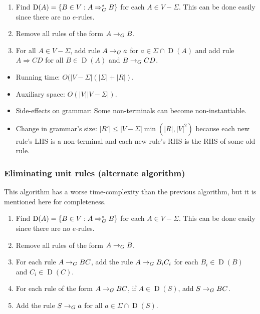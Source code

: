 \begin{enumerate}
\item Find $\operatorname{D}(A) = \{B \in V: A \Rightarrow_{G}^* B\}$ for each $A \in V-\Sigma$.
    This can be done easily since there are no $e$-rules.
\item Remove all rules of the form $A \rightarrow_{G} B$.
\item For all $A \in V - \Sigma$, add rule $A \rightarrow_{G} a$ for $a \in \Sigma \cap \operatorname{D}(A)$
    and add rule $A \Rightarrow CD$ for all $B \in \operatorname{D}(A)$ and $B \rightarrow_{G} CD$.
\end{enumerate}

\begin{itemize}
\item Running time: $O(|V-\Sigma|(|\Sigma| + |R|)$.
\item Auxiliary space: $O(|V||V-\Sigma|)$.
\item Side-effects on grammar: Some non-terminals can become non-instantiable.
\item Change in grammar's size: $|R'| \le |V-\Sigma|\min(|R|, |V|^2)$
    because each new rule's LHS is a non-terminal and each new rule's RHS is the RHS of some old rule.
\end{itemize}

\subsubsection{Eliminating unit rules (alternate algorithm)}

This algorithm has a worse time-complexity than the previous algorithm,
but it is mentioned here for completeness.

\begin{enumerate}
\item Find $\operatorname{D}(A) = \{B \in V: A \Rightarrow_{G}^* B\}$ for each $A \in V-\Sigma$.
    This can be done easily since there are no $e$-rules.
\item Remove all rules of the form $A \rightarrow_{G} B$.
\item For each rule $A \rightarrow_{G} BC$, add the rule
    $A \rightarrow_{G} B_iC_i$ for each $B_i \in \operatorname{D}(B)$ and $C_i \in \operatorname{D}(C)$.
\item For each rule of the form $A \rightarrow_{G} BC$, if $A \in \operatorname{D}(S)$,
    add $S \rightarrow_{G} BC$.
\item Add the rule $S \rightarrow_{G} a$ for all $a \in \Sigma \cap \operatorname{D}(S)$.
\end{enumerate}

